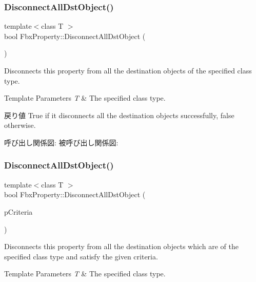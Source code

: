 \subsubsection{\texorpdfstring{Disconnect\+All\+Dst\+Object()}{DisconnectAllDstObject()}\hspace{0.1cm}{\footnotesize\ttfamily [3/4]}}
{\footnotesize\ttfamily template$<$class T $>$ \\
bool Fbx\+Property\+::\+Disconnect\+All\+Dst\+Object (\begin{DoxyParamCaption}{ }\end{DoxyParamCaption})}

Disconnects this property from all the destination objects of the specified class type. 
\begin{DoxyTemplParams}{Template Parameters}
{\em T} & The specified class type. \\
\hline
\end{DoxyTemplParams}
\begin{DoxyReturn}{戻り値}
{\ttfamily True} if it disconnects all the destination objects successfully, {\ttfamily false} otherwise. 
\end{DoxyReturn}
呼び出し関係図\+:
被呼び出し関係図\+:
\mbox{\label{class_fbx_property_aa87d6cc464919a95dd7fd428b28c6e48}} 
\subsubsection{\texorpdfstring{Disconnect\+All\+Dst\+Object()}{DisconnectAllDstObject()}\hspace{0.1cm}{\footnotesize\ttfamily [4/4]}}
{\footnotesize\ttfamily template$<$class T $>$ \\
bool Fbx\+Property\+::\+Disconnect\+All\+Dst\+Object (\begin{DoxyParamCaption}\item[{const \hyperlink{class_fbx_criteria}{Fbx\+Criteria} \&}]{p\+Criteria }\end{DoxyParamCaption})}

Disconnects this property from all the destination objects which are of the specified class type and satisfy the given criteria. 
\begin{DoxyTemplParams}{Template Parameters}
{\em T} & The specified class type. \\
\hline
\end{DoxyTemplParams}

